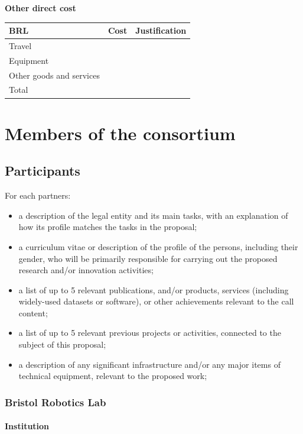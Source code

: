\documentclass[]{article}
\providecommand{\tightlist}{%
  \setlength{\itemsep}{0pt}\setlength{\parskip}{0pt}}
\let\oldparagraph\paragraph
\renewcommand{\paragraph}[1]{\oldparagraph{#1}\mbox{}}
\begin{document}
\textbf{Other direct cost}

\begin{longtable}[]{@{}lll@{}}
\toprule
BRL & Cost & Justification\tabularnewline
\midrule
\endhead
Travel & &\tabularnewline
Equipment & &\tabularnewline
Other goods and services & &\tabularnewline
Total & &\tabularnewline
\bottomrule
\end{longtable}

\newpage

\hypertarget{members-of-the-consortium}{%
\section{Members of the consortium}\label{members-of-the-consortium}}

\hypertarget{participants}{%
\subsection{Participants}\label{participants}}

For each partners:

\begin{itemize}
\tightlist
\item
  a description of the legal entity and its main tasks, with an
  explanation of how its profile matches the tasks in the proposal;
\item
  a curriculum vitae or description of the profile of the persons,
  including their gender, who will be primarily responsible for carrying
  out the proposed research and/or innovation activities;
\item
  a list of up to 5 relevant publications, and/or products, services
  (including widely-used datasets or software), or other achievements
  relevant to the call content;
\item
  a list of up to 5 relevant previous projects or activities, connected
  to the subject of this proposal;
\item
  a description of any significant infrastructure and/or any major items
  of technical equipment, relevant to the proposed work;
\end{itemize}

\hypertarget{bristol-robotics-lab}{%
\subsubsection{Bristol Robotics Lab}\label{bristol-robotics-lab}}

\hypertarget{institution}{%
\paragraph{Institution}\label{institution}}
\end{document}
